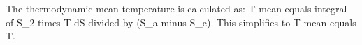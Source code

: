 The thermodynamic mean temperature is calculated as:  
T mean equals integral of S_2 times T dS divided by (S_a minus S_e).  
This simplifies to T mean equals T.